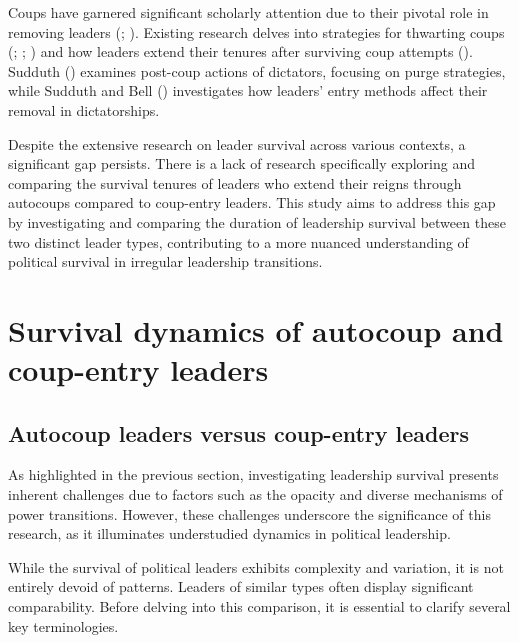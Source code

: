 \documentclass[
  12pt,
]{report}
\begin{document}
Coups have garnered significant scholarly attention due to their pivotal
role in removing leaders (;
). Existing research
delves into strategies for thwarting coups (; ;
) and how leaders extend their
tenures after surviving coup attempts (). Sudduth () examines
post-coup actions of dictators, focusing on purge strategies, while
Sudduth and Bell () investigates how
leaders' entry methods affect their removal in dictatorships.

Despite the extensive research on leader survival across various
contexts, a significant gap persists. There is a lack of research
specifically exploring and comparing the survival tenures of leaders who
extend their reigns through autocoups compared to coup-entry leaders.
This study aims to address this gap by investigating and comparing the
duration of leadership survival between these two distinct leader types,
contributing to a more nuanced understanding of political survival in
irregular leadership transitions.

\section{Survival dynamics of autocoup and coup-entry
leaders}\label{survival-dynamics-of-autocoup-and-coup-entry-leaders}

\subsection{Autocoup leaders versus coup-entry
leaders}\label{autocoup-leaders-versus-coup-entry-leaders}

As highlighted in the previous section, investigating leadership
survival presents inherent challenges due to factors such as the opacity
and diverse mechanisms of power transitions. However, these challenges
underscore the significance of this research, as it illuminates
understudied dynamics in political leadership.

While the survival of political leaders exhibits complexity and
variation, it is not entirely devoid of patterns. Leaders of similar
types often display significant comparability. Before delving into this
comparison, it is essential to clarify several key terminologies.
\end{document}
